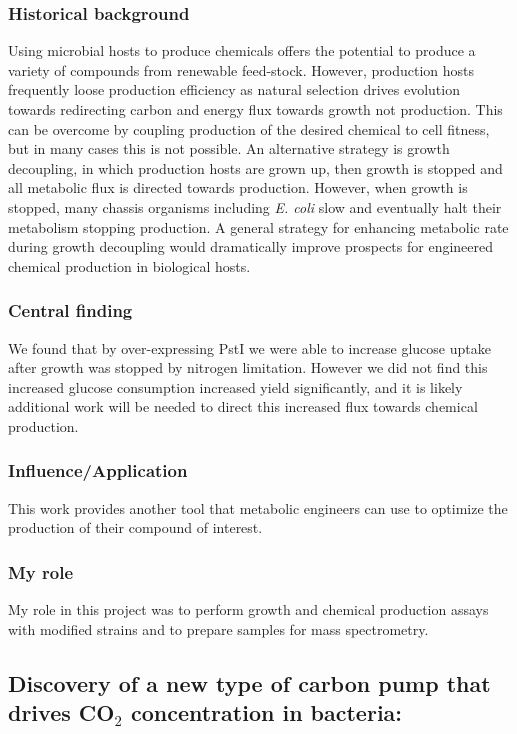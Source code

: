\documentclass{article}
\begin{document}
\subsubsection{Historical background}
Using microbial hosts to produce chemicals offers the potential to produce a variety of compounds from renewable feed-stock.
However, production hosts frequently loose production efficiency as natural selection drives evolution towards redirecting carbon and energy flux towards growth not production.
This can be overcome by coupling production of the desired chemical to cell fitness, but in many cases this is not possible.
An alternative strategy is growth decoupling, in which production hosts are grown up, then growth is stopped and all metabolic flux is directed towards production.
However, when growth is stopped, many chassis organisms including \textit{E. coli} slow and eventually halt their metabolism stopping production.
A general strategy for enhancing metabolic rate during growth decoupling would dramatically improve prospects for engineered chemical production in biological hosts.
%
\subsubsection{Central finding}
We found that by over-expressing PstI we were able to increase glucose uptake after growth was stopped by nitrogen limitation. 
However we did not find this increased glucose consumption increased yield significantly, and it is likely additional work will be needed to direct this increased flux towards chemical production.
%
\subsubsection{Influence/Application}
This work provides another tool that metabolic engineers can use to optimize the production of their compound of interest.
%
\subsubsection{My role}
My role in this project was to perform growth and chemical production assays with modified strains and to prepare samples for mass spectrometry.
%
\nocite{Chubukov2017-uu}
\printbibliography[heading=none]

\leavevmode\newline

\newrefsection
\subsection{Discovery of a new type of carbon pump that drives CO$_2$ concentration in bacteria:}
\end{document}

